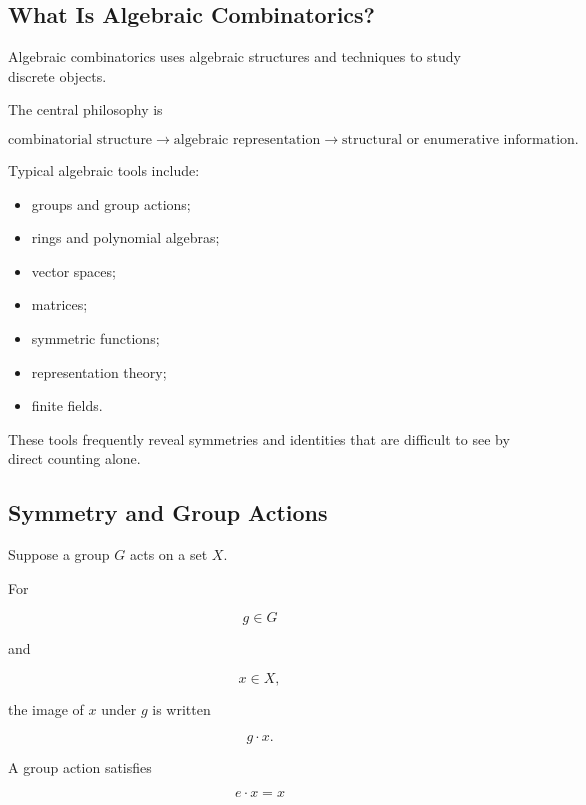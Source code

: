 \subsection{What Is Algebraic Combinatorics?}
\label{subsec:what-is-algebraic-combinatorics}

Algebraic combinatorics uses algebraic structures and techniques to
study discrete objects.

The central philosophy is

\[
\boxed{
\text{combinatorial structure}
\longrightarrow
\text{algebraic representation}
\longrightarrow
\text{structural or enumerative information}.
}
\]

Typical algebraic tools include:

\begin{itemize}
    \item groups and group actions;
    \item rings and polynomial algebras;
    \item vector spaces;
    \item matrices;
    \item symmetric functions;
    \item representation theory;
    \item finite fields.
\end{itemize}

These tools frequently reveal symmetries and identities that are
difficult to see by direct counting alone.

\subsection{Symmetry and Group Actions}
\label{subsec:symmetry-group-actions}

Suppose a group \(G\) acts on a set \(X\).

For

\[
g\in G
\]

and

\[
x\in X,
\]

the image of \(x\) under \(g\) is written

\[
g\cdot x.
\]

A group action satisfies

\[
\boxed{
e\cdot x=x
}
\]

